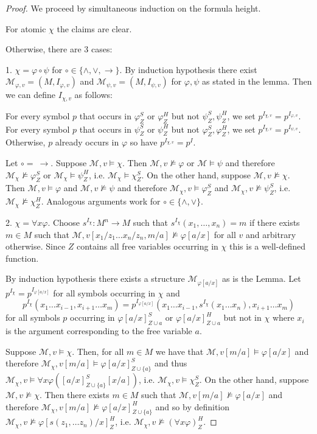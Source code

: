 \documentclass[a4paper,11pt]{report}
\theoremstyle{definition}
\theoremstyle{definition}
\theoremstyle{definition}
\theoremstyle{definition}
\theoremstyle{definition}
\theoremstyle{definition}
\theoremstyle{definition}
\begin{document}
	\begin{proof}
		We proceed by simultaneous induction on the formula height.
		
		For atomic $\chi$ the claims are clear.
		
		Otherwise, there are $3$ cases:
		
		1. $\chi = \varphi\circ\psi$ for $\circ\in\{\wedge,\vee,\to\}$. By induction hypothesis there exist $\mathcal M_{\varphi, v} = (M, I_{\varphi, v})$ and $\mathcal M_{\psi, v} = (M, I_{\psi, v})$ for $\varphi,\psi$ as stated in the lemma.
		Then we can define $I_{\chi, v}$ as follows:
		
		For every symbol $p$ that occurs in $\varphi^S_Z$ or $\varphi^H_Z$ but not $\psi^S_Z, \psi^H_Z$, we set $p^{I_{\chi, v}} = p^{I_{\varphi, v}}$. For every symbol $p$ that occurs in $\psi^S_Z$ or $\psi^H_Z$ but not $\varphi^S_Z, \varphi^H_Z$, we set $p^{I_{\chi, v}} = p^{I_{\psi, v}}$. Otherwise, $p$ already occurs in $\varphi$ so have $p^{I_{\chi, v}} = p^I$.
		
		Let $\circ=\ \to$. Suppose $\mathcal M, v\models\chi$. Then $\mathcal M, v\not\models\varphi$ or $\mathcal M\models\psi$ and therefore $\mathcal M_\chi\not\models\varphi^S_Z$ or $\mathcal M_\chi\models\psi^H_Z$, i.e. $\mathcal M_\chi\models\chi^S_Z$. On the other hand, suppose $\mathcal M, v\not\models\chi$. Then $\mathcal M, v\models\varphi$ and $\mathcal M, v\not\models\psi$ and therefore $\mathcal M_\chi, v\models \varphi^S_Z$ and $\mathcal M_\chi, v\not\models\psi^S_Z$, i.e. $\mathcal M_\chi\not\models\chi^H_Z$. Analogous arguments work for $\circ\in\{\wedge, \vee\}$.
		
		2. $\chi = \forall x\varphi$. Choose $s^{I_\chi}:M^n\to M$ such that $s^{I_\chi}(x_1,\dots, x_n) = m$ if there exists $m\in M$ such that $\mathcal M, v[x_1/z_1\dots x_n/z_n, m/a]\not\models\varphi[a/x]$ for all $v$ and arbitrary otherwise. Since $Z$ contains all free variables occurring in $\chi$ this is a well-defined function.
		
		By induction hypothesis there exists a structure $\mathcal M_{\varphi[a/x]}$ as is the Lemma. Let $p^{I_\chi} = p^{I_{\varphi[a/x]}}$ for all symbols occurring in $\chi$ and $$p^{I_\chi}(x_1\dots x_{i-1}, x_{i+1}\dots x_m) = p^{I_{\varphi[a/x]}}(x_1\dots x_{i-1}, s^{I_\chi}(x_1\dots x_n), x_{i+1}\dots x_m)$$ for all symbols $p$ occurring in $\varphi[a/x]^S_{Z\cup a}$ or $\varphi[a/x]^H_{Z\cup a}$ but not in $\chi$ where $x_i$ is the argument corresponding to the free variable $a$.
		
		Suppose $\mathcal M, v\models\chi$. Then, for all $m\in M$ we have that $\mathcal M, v[m/a]\models\varphi[a/x]$ and therefore $\mathcal M_{\chi}, v[m/a]\models\varphi[a/x]^S_{Z\cup\{a\}}$ and thus $\mathcal M_{\chi}, v\models \forall x\varphi([a/x]^S_{Z\cup\{a\}}[x/a])$, i.e. $\mathcal M_\chi,v\models \chi^S_Z$. On the other hand, suppose $\mathcal M, v\not\models\chi$. Then there exists $m\in M$ such that $\mathcal M, v[m/a]\not\models\varphi[a/x]$ and therefore $\mathcal M_\chi, v[m/a]\not\models\varphi[a/x]^H_{Z\cup\{a\}}$ and so by definition $\mathcal M_\chi, v\not\models\varphi[s(z_1,\dots z_n)/x]^H_Z$, i.e. $\mathcal M_\chi, v\not\models(\forall x\varphi)^H_Z$.
		

\end{proof}
\end{document}
